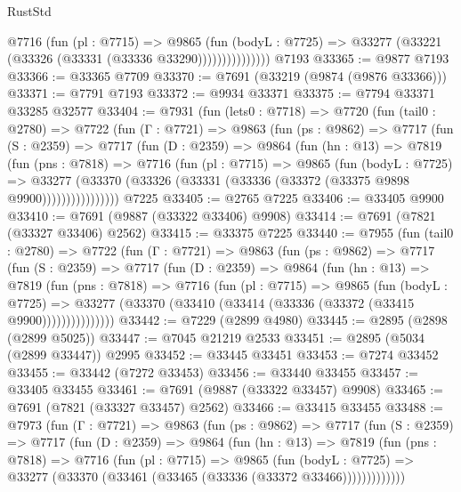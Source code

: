 \begin{lexlean}{RustStd}
\begin{coremodule}
                    @7716
                      (fun (pl : @7715) =>
                      @9865
                        (fun (bodyL : @7725) =>
                        @33277 (@33221 (@33326 (@33331 (@33336 @33290)))))))))))))))
    @7193
@33365 := @9877 @7193
@33366 := @33365 @7709
@33370 := @7691 (@33219 (@9874 (@9876 @33366)))
@33371 := @7791 @7193
@33372 := @9934 @33371
@33375 := @7794 @33371 @33285 @32577
@33404 := @7931
    (fun (lets0 : @7718) =>
    @7720
      (fun (tail0 : @2780) =>
      @7722
        (fun (Γ : @7721) =>
        @9863
          (fun (ps : @9862) =>
          @7717
            (fun (S : @2359) =>
            @7717
              (fun (D : @2359) =>
              @9864
                (fun (hn : @13) =>
                @7819
                  (fun (pns : @7818) =>
                  @7716
                    (fun (pl : @7715) =>
                    @9865
                      (fun (bodyL : @7725) =>
                      @33277
                        (@33370 (@33326 (@33331 (@33336 (@33372 (@33375 @9898 @9900))))))))))))))))
    @7225
@33405 := @2765 @7225
@33406 := @33405 @9900
@33410 := @7691 (@9887 (@33322 @33406) @9908)
@33414 := @7691 (@7821 (@33327 @33406) @2562)
@33415 := @33375 @7225
@33440 := @7955
    (fun (tail0 : @2780) =>
    @7722
      (fun (Γ : @7721) =>
      @9863
        (fun (ps : @9862) =>
        @7717
          (fun (S : @2359) =>
          @7717
            (fun (D : @2359) =>
            @9864
              (fun (hn : @13) =>
              @7819
                (fun (pns : @7818) =>
                @7716
                  (fun (pl : @7715) =>
                  @9865
                    (fun (bodyL : @7725) =>
                    @33277 (@33370 (@33410 (@33414 (@33336 (@33372 (@33415 @9900)))))))))))))))
@33442 := @7229 (@2899 @4980)
@33445 := @2895 (@2898 (@2899 @5025))
@33447 := @7045 @21219 @2533
@33451 := @2895 (@5034 (@2899 @33447)) @2995
@33452 := @33445 @33451
@33453 := @7274 @33452
@33455 := @33442 (@7272 @33453)
@33456 := @33440 @33455
@33457 := @33405 @33455
@33461 := @7691 (@9887 (@33322 @33457) @9908)
@33465 := @7691 (@7821 (@33327 @33457) @2562)
@33466 := @33415 @33455
@33488 := @7973
    (fun (Γ : @7721) =>
    @9863
      (fun (ps : @9862) =>
      @7717
        (fun (S : @2359) =>
        @7717
          (fun (D : @2359) =>
          @9864
            (fun (hn : @13) =>
            @7819
              (fun (pns : @7818) =>
              @7716
                (fun (pl : @7715) =>
                @9865
                  (fun (bodyL : @7725) =>
                  @33277 (@33370 (@33461 (@33465 (@33336 (@33372 @33466)))))))))))))

\end{coremodule}
\end{lexlean}

